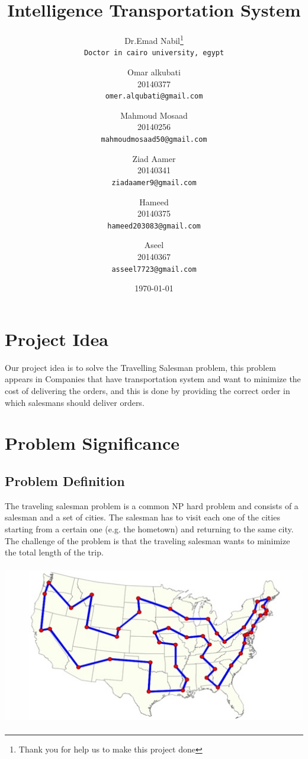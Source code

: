 \documentclass[12pt]{article}
\title{\bf{Intelligence Transportation System}}
\author{
  Dr.Emad Nabil\thanks{Thank you for help us to make this project done}\\
  \texttt{Doctor in cairo university, egypt}
  \and
  Omar alkubati\\
  20140377\\
  \texttt{omer.alqubati@gmail.com}
  \and
  Mahmoud Mosaad\\
  20140256\\
  \texttt{mahmoudmosaad50@gmail.com}
  \and
  Ziad Aamer\\
  20140341\\
  \texttt{ziadaamer9@gmail.com}
  \and
  Hameed\\
  20140375\\
  \texttt{hameed203083@gmail.com}
  \and
  Aseel\\
  20140367\\
  \texttt{asseel7723@gmail.com}
}
\date{\today }
\newcommand\blankpage{%
    \null
    \thispagestyle{empty}%
    \addtocounter{page}{-1}%
    \newpage}
\begin{document}
\begin{titlepage}
\clearpage\maketitle
\thispagestyle{empty}
\end{titlepage}

\blankpage
\tableofcontents
\newpage

\section{\sc Project Idea}
Our project idea is to solve the Travelling Salesman problem, this problem appears in Companies that have transportation system and want to minimize the cost of delivering the orders, and this is done by providing the correct order in which salesmans should deliver orders.

\section{\sc Problem Significance}

\subsection{ Problem Definition }
The traveling salesman problem is a common NP hard problem and consists of a salesman and a set of cities. The salesman has to visit each one of the cities starting from a certain one (e.g. the hometown) and returning to the same city. The challenge of the problem is that the traveling salesman wants to minimize the total length of the trip.
\begin{center}
	\includegraphics[width=15cm,height=7cm]{./assets/example/tsp.png}\\
\end{center}
\end{document}
